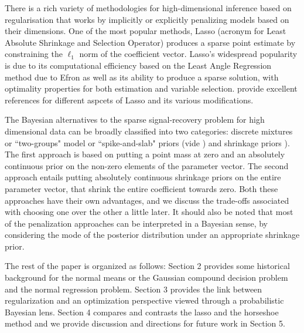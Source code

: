 \documentclass[11pt]{article}
\numberwithin{equation}{section}
\begin{document}
There is a rich variety of methodologies for high-dimensional inference based on regularisation that works by implicitly or explicitly penalizing models based on their dimensions. One of the most popular methods, Lasso (acronym for Least Absolute Shrinkage and Selection Operator) produces a sparse point estimate by constraining the $\ell_1$ norm of the coefficient vector. Lasso's widespread popularity is due to its computational efficiency based on the Least Angle Regression method due to Efron as well as its ability to produce a sparse solution, with optimality properties for both estimation and variable selection. \cite{buhlmann2011statistics, james2013introduction, hastie2015statistical} provide excellent references for different aspcets of Lasso and its various modifications. \par 

The Bayesian alternatives to the sparse signal-recovery problem for high dimensional data can be broadly classified into two categories: discrete mixtures or ``two-groups" model or ``spike-and-slab" priors (vide \citet{johnstone2004needles,efron2010large,efron2008microarrays,bogdan2011asymptotic}) and shrinkage priors \cite{armagan2011generalized,armagan2013generalized,carvalho2009handling,carvalho2010horseshoe,griffin2005alternative,polson2010shrink,castillo2012needles}). The first approach is based on putting a point mass at zero and an absolutely continuous prior on the non-zero elements of the parameter vector. The second approach entails putting absolutely continuous shrinkage priors on the entire parameter vector, that shrink the entire coefficient towards zero. Both these approaches have their own advantages, and we discuss the trade-offs associated with choosing one over the other a little later.  It should also be noted that most of the penalization approaches can be interpreted in a Bayesian sense, by considering the mode of the posterior distribution under an appropriate shrinkage prior. 


The rest of the paper is organized as follows: Section 2 provides some historical background for the normal means or the Gaussian compound decision problem and the normal regression problem. Section 3 provides the link between regularization and an optimization perspective viewed through a probabilistic Bayesian lens. Section 4 compares and contrasts the lasso and the horseshoe method and we provide discussion and directions for future work in Section 5. 
\end{document}
